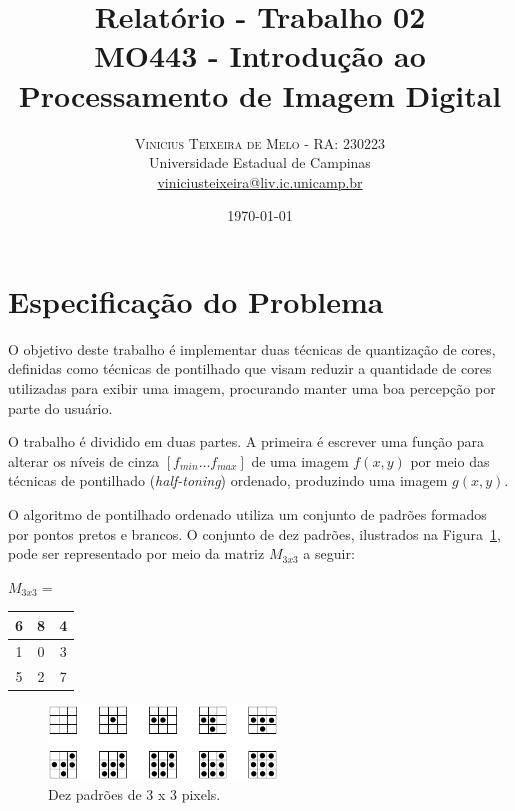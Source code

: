 \documentclass[twoside,twocolumn]{article}
\title{Relatório - Trabalho 02 \\ \Large MO443 - Introdução ao Processamento de Imagem Digital} %
\author{%
\textsc{Vinicius Teixeira de Melo - RA: 230223} \\[1ex] %
\normalsize Universidade Estadual de Campinas \\ %
\normalsize \href{mailto:viniciusteixeira@liv.ic.unicamp.br}{viniciusteixeira@liv.ic.unicamp.br} %
}
\date{\today} %
\begin{document}
\maketitle


\section{Especificação do Problema}

O objetivo deste trabalho é implementar duas técnicas de quantização de cores, definidas como técnicas de pontilhado que visam reduzir a quantidade de cores utilizadas para exibir uma imagem, procurando manter uma boa percepção por parte do usuário.

O trabalho é dividido em duas partes. A primeira é escrever uma função para alterar os níveis de cinza $[f_{min} \dots f_{max}]$ de uma imagem $f(x,y)$ por meio das técnicas de pontilhado (\textit{half-toning}) ordenado, produzindo uma imagem $g(x,y)$.

O algoritmo de pontilhado ordenado utiliza um conjunto de padrões formados por pontos pretos e brancos. O conjunto de dez padrões, ilustrados na Figura~\ref{padroes}, pode ser representado por meio da matriz $M_{3x3}$ a seguir:

\vspace{0.5cm}

$M_{3x3} = $ \begin{tabular}{|c|c|c|}
\hline
6 & 8 & 4 \\ \hline
1 & 0 & 3 \\ \hline
5 & 2 & 7 \\ \hline
\end{tabular}

\begin{figure}[H]
\begin{center}
	\includegraphics[height=2cm]{figures/padroes.png}
\caption{Dez padrões de 3 x 3 pixels.} \label{padroes}
\end{center}
\end{figure}
\end{document}
